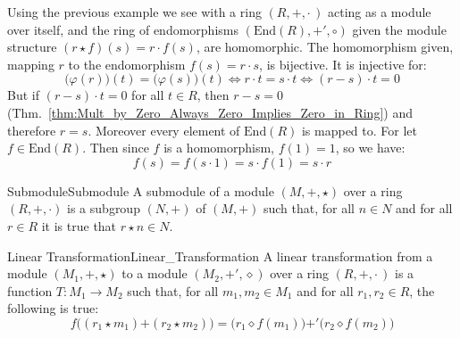     \begin{example}
        Using the previous example we see with a ring $(R,+,\cdot\,)$ acting as
        a module over itself, and the ring of endomorphisms
        $(\textrm{End}(R),\boldsymbol{+}',\circ)$ given the module structure
        $(r\star{f})(s)=r\cdot{f}(s)$, are homomorphic. The homomorphism given,
        mapping $r$ to the endomorphism $f(s)=r\cdot{s}$, is bijective. It is
        injective for:
        \begin{subequations}
            \begin{equation}
                \big(\varphi(r)\big)(t)=\big(\varphi(s)\big)(t)
                \Leftrightarrow
                r\cdot{t}=s\cdot{t}
                \Leftrightarrow
                (r-s)\cdot{t}=0
            \end{equation}
        \end{subequations}
        But if $(r-s)\cdot{t}=0$ for all $t\in{R}$, then $r-s=0$
        (Thm.~\ref{thm:Mult_by_Zero_Always_Zero_Implies_Zero_in_Ring}) and
        therefore $r=s$. Moreover every element of $\textrm{End}(R)$ is mapped
        to. For let $f\in\textrm{End}(R)$. Then since $f$ is a homomorphism,
        $f(1)=1$, so we have:
        \begin{equation}
            f(s)=f(s\cdot{1})=s\cdot{f}(1)=s\cdot{r}
        \end{equation}
    \end{example}
    \begin{fdefinition}{Submodule}{Submodule}
        A \gls{submodule} of a \gls{module}
        $(M,\boldsymbol{+},\star)$ over a ring $(R,+,\cdot)$ is a \gls{subgroup}
        $(N,\boldsymbol{+})$ of $(M,\boldsymbol{+})$ such that, for all
        $n\in{N}$ and for all $r\in{R}$ it is true that $r\star{n}\in{N}$.
    \end{fdefinition}
    \begin{fdefinition}{Linear Transformation}{Linear_Transformation}
        A linear transformation from a module $(M_{1},\boldsymbol{+},\star)$ to
        a module $(M_{2},\boldsymbol{+}',\diamond)$ over a ring
        $(R,+,\cdot\,)$ is a function $T:M_{1}\rightarrow{M}_{2}$ such that,
        for all $m_{1},m_{2}\in{M}_{1}$ and for all $r_{1},r_{2}\in{R}$, the
        following is true:
        \begin{equation*}
            f\big((r_{1}\star{m}_{1})\boldsymbol{+}(r_{2}\star{m}_{2})\big)
            =\big(r_{1}\diamond{f}(m_{1})\big)\boldsymbol{+}'
                \big(r_{2}\diamond{f}(m_{2})\big)
        \end{equation*}
    \end{fdefinition}
